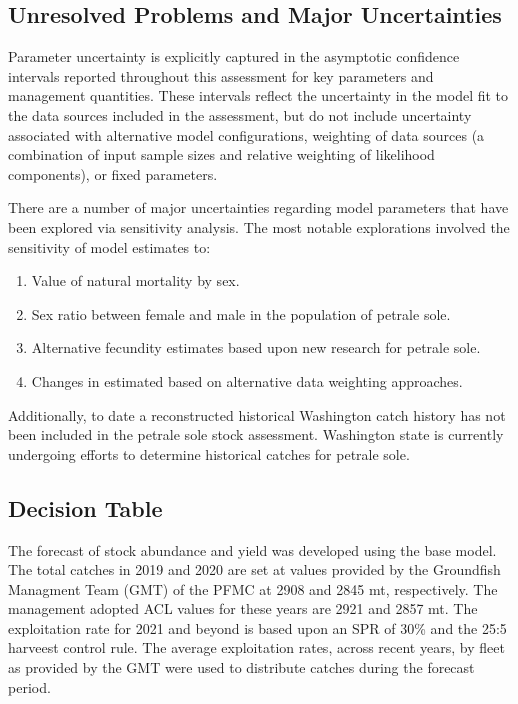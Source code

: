 \documentclass[12pt,]{article}
\begin{document}
\FloatBarrier

\subsection*{Unresolved Problems and Major
Uncertainties}\label{unresolved-problems-and-major-uncertainties}

Parameter uncertainty is explicitly captured in the asymptotic
confidence intervals reported throughout this assessment for key
parameters and management quantities. These intervals reflect the
uncertainty in the model fit to the data sources included in the
assessment, but do not include uncertainty associated with alternative
model configurations, weighting of data sources (a combination of input
sample sizes and relative weighting of likelihood components), or fixed
parameters.

There are a number of major uncertainties regarding model parameters
that have been explored via sensitivity analysis. The most notable
explorations involved the sensitivity of model estimates to:

\begin{enumerate}

\item Value of natural mortality by sex.

\item Sex ratio between female and male in the population of petrale sole.

\item Alternative fecundity estimates based upon new research for petrale sole.

\item Changes in estimated based on alternative data weighting approaches.

\end{enumerate}

Additionally, to date a reconstructed historical Washington catch
history has not been included in the petrale sole stock assessment.
Washington state is currently undergoing efforts to determine historical
catches for petrale sole.

\subsection*{Decision Table}\label{decision-table}

The forecast of stock abundance and yield was developed using the base
model. The total catches in 2019 and 2020 are set at values provided by
the Groundfish Managment Team (GMT) of the PFMC at 2908 and 2845 mt,
respectively. The management adopted ACL values for these years are 2921
and 2857 mt. The exploitation rate for 2021 and beyond is based upon an
SPR of 30\% and the 25:5 harveest control rule. The average exploitation
rates, across recent years, by fleet as provided by the GMT were used to
distribute catches during the forecast period.
\end{document}
